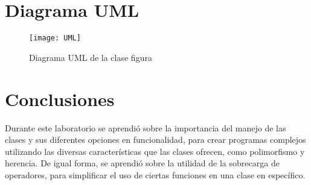 \documentclass[11pt]{article}
\begin{document}
\section{Diagrama UML}
\begin{figure}[!ht]
	\caption{Diagrama UML de la clase figura}
	\centering
	\texttt{[image: UML]}
\end{figure}


\section{Conclusiones}
Durante este laboratorio se aprendió sobre la importancia del manejo de las clases y sus diferentes opciones en funcionalidad, para crear programas complejos utilizando las diversas características que las clases ofrecen, como polimorfismo y herencia. De igual forma, se aprendió sobre la utilidad de la sobrecarga de operadores, para simplificar el uso de ciertas funciones en una clase en específico.
\end{document}
